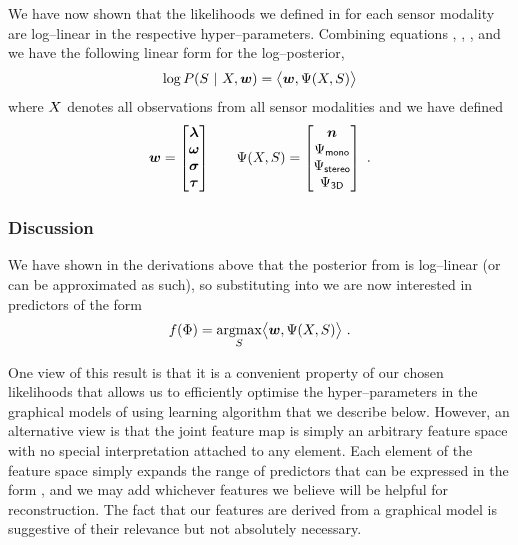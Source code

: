 We have now shown that the likelihoods we defined in 
for each sensor modality are log--linear in the respective
hyper--parameters. Combining equations ,
, ,
and  we have the following linear form for
the log--posterior,
\begin{equation}
  \log P(\Seam ~|~ X, \Model)
  =
  \bigl\langle
    \Model, \JointFtr(\Observations,\Seam)
  \bigr\rangle
  \label{eq:log-linear-posterior}
\end{equation}
where $\Observations$ denotes all observations from all sensor
modalities and we have defined
\begin{align}
  \Model = \begin{bmatrix}
    \Penalties \\
    \PixelModel \\
    \StereoModel \\
    \IndModel
  \end{bmatrix}
  & \quad &
  \JointFtr(\Observations,\Seam) = \begin{bmatrix}
    \Counts \\
    \JointFtr_{\textsf{mono}} \\
    \JointFtr_{\textsf{stereo}} \\
    \JointFtr_{\textsf{3D}}
  \end{bmatrix}~.
\end{align}

\subsubsection{Discussion}

We have shown in the derivations above that the posterior from
 is log--linear (or can be approximated as such),
so substituting  into
 we are now interested in predictors of the form
\begin{equation}
  \label{eq:linear-predictor}
  \Predictor(\Features) = 
  \argmax_{\Seam}\limits
  \bigl\langle
    \Model, \JointFtr(\Observations,\Seam)
  \bigr\rangle~.
\end{equation}

One view of this result is that it is a convenient property of our
chosen likelihoods that allows us to efficiently optimise the
hyper--parameters in the graphical models of  using
learning algorithm that we describe below. However, an alternative
view is that the joint feature map is simply an arbitrary feature
space with no special interpretation attached to any element. Each
element of the feature space simply expands the range of predictors
that can be expressed in the form , and we
may add whichever features we believe will be helpful for
reconstruction. The fact that our features are derived from a
graphical model is suggestive of their relevance but not absolutely
necessary.

